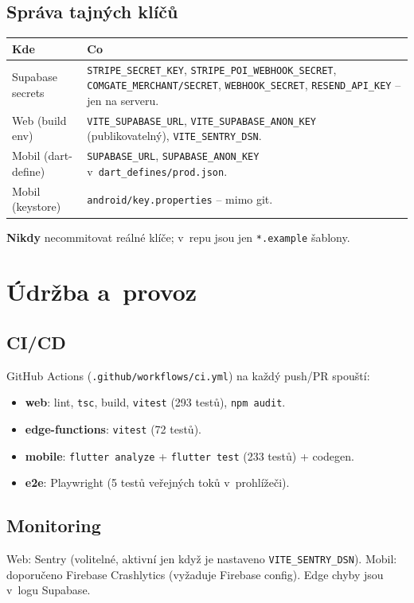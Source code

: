\documentclass[11pt,a4paper]{article}
\newcommand{\code}[1]{\texttt{#1}}
\begin{document}
\subsection{Správa tajných klíčů}
\begin{longtable}{@{}p{5.2cm}p{9.2cm}@{}}
\toprule
\textbf{Kde} & \textbf{Co} \\
\midrule
\endhead
Supabase secrets & \code{STRIPE\_SECRET\_KEY}, \code{STRIPE\_POI\_WEBHOOK\_SECRET},
  \code{COMGATE\_MERCHANT/SECRET}, \code{WEBHOOK\_SECRET}, \code{RESEND\_API\_KEY} -- jen na serveru. \\
Web (build env) & \code{VITE\_SUPABASE\_URL}, \code{VITE\_SUPABASE\_ANON\_KEY} (publikovatelný), \code{VITE\_SENTRY\_DSN}. \\
Mobil (dart-define) & \code{SUPABASE\_URL}, \code{SUPABASE\_ANON\_KEY} v~\code{dart\_defines/prod.json}. \\
Mobil (keystore) & \code{android/key.properties} -- mimo git. \\
\bottomrule
\end{longtable}
\textbf{Nikdy} necommitovat reálné klíče; v~repu jsou jen \code{*.example} šablony.

\section{Údržba a~provoz}

\subsection{CI/CD}
GitHub Actions (\code{.github/workflows/ci.yml}) na každý push/PR spouští:
\begin{itemize}[nosep]
  \item \textbf{web}: lint, \code{tsc}, build, \code{vitest} (293 testů), \code{npm audit}.
  \item \textbf{edge-functions}: \code{vitest} (72 testů).
  \item \textbf{mobile}: \code{flutter analyze} + \code{flutter test} (233 testů) + codegen.
  \item \textbf{e2e}: Playwright (5 testů veřejných toků v~prohlížeči).
\end{itemize}

\subsection{Monitoring}
Web: Sentry (volitelné, aktivní jen když je nastaveno \code{VITE\_SENTRY\_DSN}).
Mobil: doporučeno Firebase Crashlytics (vyžaduje Firebase config). Edge chyby
jsou v~logu Supabase.
\end{document}
